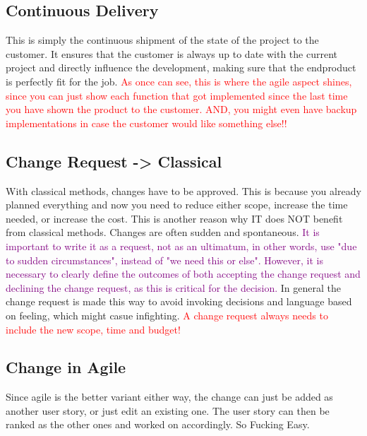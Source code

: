 \documentclass[main.tex,fontsize=12pt,paper=a4,paper=landscape,DIV=calc,]{scrartcl}
\begin{document}
\begin{multicols*}{2}
\subsection{Continuous Delivery}
This is simply the continuous shipment of the state of the project to the customer. \newline
It ensures that the customer is always up to date with the current project and directly influence the development, making sure that the endproduct is perfectly fit for the job.\newline
\textcolor{red}{As once can see, this is where the agile aspect shines, since you can just show each function that got implemented since the last time you have shown the product to the customer.\newline
AND, you might even have backup implementations in case the customer would like something else!!}

\subsection{Change Request -> Classical}
With classical methods, changes have to be approved. This is because you already planned everything and now you need to reduce either scope, increase the time needed, or increase the cost. \newline
This is another reason why IT does NOT benefit from classical methods. Changes are often sudden and spontaneous. \newline
\textcolor{purple}{It is important to write it as a request, not as an ultimatum, in other words, use "due to sudden circumstances", instead of "we need this or else".\newline
However, it is necessary to clearly define the outcomes of both accepting the change request and declining the change request, as this is critical for the decision.}\newline
In general the change request is made this way to avoid invoking decisions and language based on feeling, which might casue infighting.\newline
\textcolor{red}{A change request always needs to include the new scope, time and budget!}

\subsection{Change in Agile}
Since agile is the better variant either way, the change can just be added as another user story, or just edit an existing one.\newline
The user story can then be ranked as the other ones and worked on accordingly. \newline
So Fucking Easy. 


\end{multicols*}
\end{document}
